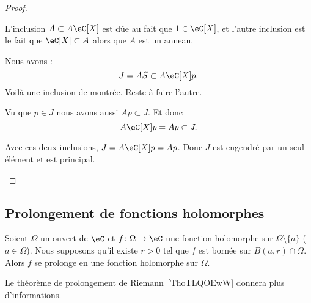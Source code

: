 \begin{proof}
\begin{subproof}
		\spitem[\( A\eC\lbrack X\rbrack=A\)]

		L'inclusion \( A\subset A\eC[X]\) est dûe au fait que \( 1\in \eC[X]\), et l'autre inclusion est le fait que \( \eC[X]\subset A\) alors que \( A\) est un anneau.


		Nous avons :
		\begin{equation}
			J=AS\subset A\eC[X]p.
		\end{equation}
		Voilà une inclusion de montrée. Reste à faire l'autre.

		Vu que \( p\in J\) nous avons aussi \( Ap\subset J\). Et donc
		\begin{equation}
			A\eC[X]p = Ap\subset J.
		\end{equation}

		Avec ces deux inclusions, \( J=A\eC[X]p=Ap\). Donc \( J\) est engendré par un seul élément et est principal.
	\end{subproof}
\end{proof}

\subsection{Prolongement de fonctions holomorphes}

\begin{proposition} \label{PropDRnYkKP}
	Soient \( \Omega\) un ouvert de \( \eC\) et \( f\colon \Omega\to \eC\) une fonction holomorphe sur \( \Omega\setminus\{ a \}\) (\( a\in \Omega\)). Nous supposons qu'il existe \( r>0\) tel que \( f\) est bornée sur \( B(a,r)\cap\Omega\). Alors \( f\) se prolonge en une fonction holomorphe sur \( \Omega\).
\end{proposition}
Le théorème de prolongement de Riemann~\ref{ThoTLQOEwW} donnera plus d'informations.

